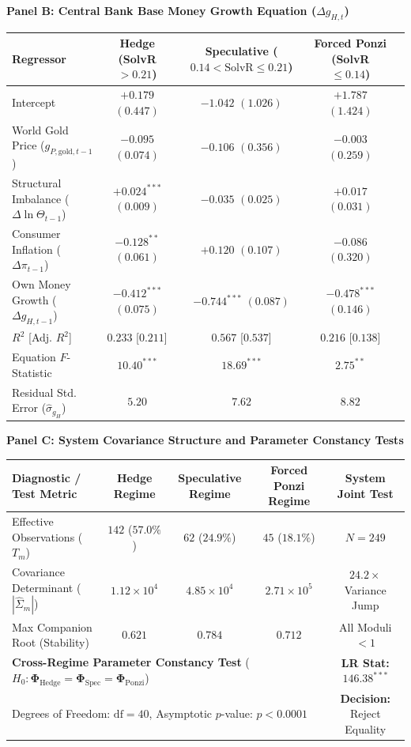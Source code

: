 \begin{table}[htbp]
\textbf{Panel B: Central Bank Base Money Growth Equation ($\Delta g_{H,t}$)}\\[0.3em]
\begin{tabularx}{\textwidth}{lcccc}
\toprule
\textbf{Regressor} & \textbf{Hedge (SolvR $> 0.21$)} & \textbf{Speculative ($0.14 < \text{SolvR} \le 0.21$)} & \textbf{Forced Ponzi (SolvR $\le 0.14$)} \\
\midrule
Intercept & $+0.179$ $(0.447)$ & $-1.042$ $(1.026)$ & $+1.787$ $(1.424)$ \\
World Gold Price ($g_{P,\text{gold},t-1}$) & $-0.095$ $(0.074)$ & $-0.106$ $(0.356)$ & $-0.003$ $(0.259)$ \\
Structural Imbalance ($\Delta \ln \Theta_{t-1}$) & $+0.024^{***}$ $(0.009)$ & $-0.035$ $(0.025)$ & $+0.017$ $(0.031)$ \\
Consumer Inflation ($\Delta \pi_{t-1}$) & $-0.128^{**}$ $(0.061)$ & $+0.120$ $(0.107)$ & $-0.086$ $(0.320)$ \\
Own Money Growth ($\Delta g_{H,t-1}$) & $-0.412^{***}$ $(0.075)$ & $-0.744^{***}$ $(0.087)$ & $-0.478^{***}$ $(0.146)$ \\
\midrule
$R^2$ [Adj. $R^2$] & $0.233$ [$0.211$] & $0.567$ [$0.537$] & $0.216$ [$0.138$] \\
Equation $F$-Statistic & $10.40^{***}$ & $18.69^{***}$ & $2.75^{**}$ \\
Residual Std. Error ($\hat{\sigma}_{g_H}$) & $5.20$ & $7.62$ & $8.82$ \\
\bottomrule
\end{tabularx}

\vspace{0.6em}

\textbf{Panel C: System Covariance Structure and Parameter Constancy Tests}\\[0.3em]
\begin{tabularx}{\textwidth}{lcccc}
\toprule
\textbf{Diagnostic / Test Metric} & \textbf{Hedge Regime} & \textbf{Speculative Regime} & \textbf{Forced Ponzi Regime} & \textbf{System Joint Test} \\
\midrule
Effective Observations ($T_m$) & $142$ ($57.0\%$) & $62$ ($24.9\%$) & $45$ ($18.1\%$) & $N = 249$ \\
Covariance Determinant ($|\hat{\Sigma}_m|$) & $1.12 \times 10^4$ & $4.85 \times 10^4$ & $2.71 \times 10^5$ & $24.2\times$ Variance Jump \\
Max Companion Root (Stability) & $0.621$ & $0.784$ & $0.712$ & All Moduli $< 1$ \\
\midrule
\multicolumn{4}{l}{\textbf{Cross-Regime Parameter Constancy Test} ($H_0: \mathbf{\Phi}_{\text{Hedge}} = \mathbf{\Phi}_{\text{Spec}} = \mathbf{\Phi}_{\text{Ponzi}}$)} & \textbf{LR Stat:} $146.38^{***}$ \\
\multicolumn{4}{l}{Degrees of Freedom: $\text{df} = 40$, Asymptotic $p$-value: $p < 0.0001$} & \textbf{Decision:} Reject Equality \\
\bottomrule
\end{tabularx}


\end{table}
